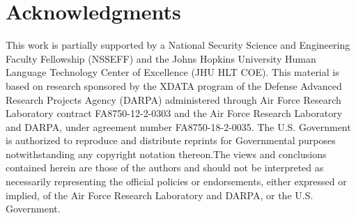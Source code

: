 \documentclass[12pt]{article}
\numberwithin{equation}{section}
\theoremstyle{definition}
\begin{document}
\section{Acknowledgments}
This work is partially supported by a
National Security Science and Engineering Faculty Fellowship (NSSEFF)
and the
Johns Hopkins University Human Language Technology Center of Excellence
(JHU HLT COE).
This material is based on research sponsored by the XDATA program of the
Defense Advanced Research Projects Agency (DARPA) administered through
Air Force Research Laboratory contract FA8750-12-2-0303 and the Air
Force Research Laboratory and DARPA, under agreement number FA8750-18-2-0035. 
The U.S. Government is authorized to reproduce and distribute reprints
for Governmental purposes notwithstanding any copyright notation
thereon.The views and conclusions contained herein are those of the
authors and should not be interpreted as necessarily representing the
official policies or endorsements, either expressed or implied, of the
Air Force Research Laboratory and DARPA, or the U.S. Government.
\newpage



\end{document}
